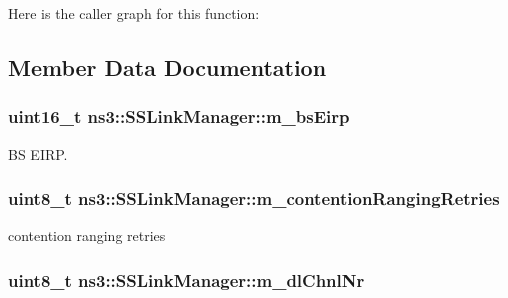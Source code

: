 Here is the caller graph for this function\+:




\subsection{Member Data Documentation}
\subsubsection[{\texorpdfstring{m\+\_\+bs\+Eirp}{m_bsEirp}}]{\setlength{\rightskip}{0pt plus 5cm}uint16\+\_\+t ns3\+::\+S\+S\+Link\+Manager\+::m\+\_\+bs\+Eirp\hspace{0.3cm}{\ttfamily [private]}}\hypertarget{classns3_1_1SSLinkManager_aab4c93b31d31b49faafdf0934e384106}{}\label{classns3_1_1SSLinkManager_aab4c93b31d31b49faafdf0934e384106}


BS E\+I\+RP. 

\subsubsection[{\texorpdfstring{m\+\_\+contention\+Ranging\+Retries}{m_contentionRangingRetries}}]{\setlength{\rightskip}{0pt plus 5cm}uint8\+\_\+t ns3\+::\+S\+S\+Link\+Manager\+::m\+\_\+contention\+Ranging\+Retries\hspace{0.3cm}{\ttfamily [private]}}\hypertarget{classns3_1_1SSLinkManager_a4cc5616652cf22b6d194bcbc85966bcb}{}\label{classns3_1_1SSLinkManager_a4cc5616652cf22b6d194bcbc85966bcb}


contention ranging retries 

\subsubsection[{\texorpdfstring{m\+\_\+dl\+Chnl\+Nr}{m_dlChnlNr}}]{\setlength{\rightskip}{0pt plus 5cm}uint8\+\_\+t ns3\+::\+S\+S\+Link\+Manager\+::m\+\_\+dl\+Chnl\+Nr\hspace{0.3cm}{\ttfamily [private]}}\hypertarget{classns3_1_1SSLinkManager_abc85be3e99ffd493514b3f71617e795a}{}\label{classns3_1_1SSLinkManager_abc85be3e99ffd493514b3f71617e795a}


